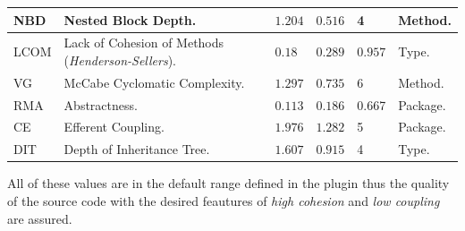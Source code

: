 \begin{longtable}{|p{1cm}|p{4cm}|p{1cm}|p{1cm}|p{1cm}|p{1cm}|p{1.5cm}|}
		NBD&Nested Block Depth.&&$1.204$&$0.516$&4&Method. \\ \hline
		LCOM&Lack of Cohesion of Methods (\textit{Henderson-Sellers}).&&$0.18$&$0.289$&$0.957$&Type.\\ \hline 
		VG&McCabe Cyclomatic Complexity.&&$1.297$&$0.735$&6&Method. \\ \hline
		RMA&Abstractness.&&$0.113$&$0.186$&0.667&Package. \\ \hline
		CE&Efferent Coupling.&&$1.976$&$1.282$&5&Package. \\ \hline
		DIT&Depth of Inheritance Tree.&&$1.607$&$0.915$&4&Type. \\ \hline
    	 \hline
        \end{longtable}      

All of these values are in the default range defined in the plugin thus the quality of the source code 
with the desired feautures of \textit{high cohesion} and \textit{low coupling} are assured.
